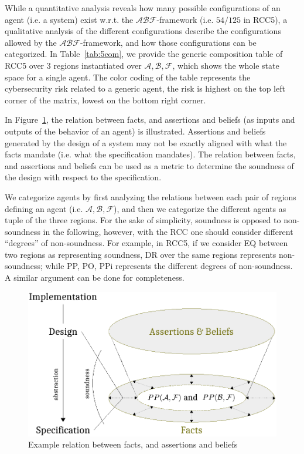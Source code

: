 \documentclass[conference]{IEEEtran}
\newcommand{\assertionRegion}{\mathcal{A}}
\newcommand{\beliefRegion}{\mathcal{B}}
\newcommand{\factRegion}{\mathcal{F}}
\newcommand{\abf}{\assertionRegion,\beliefRegion,\factRegion}
\newcommand{\abftheory}{\assertionRegion\beliefRegion\factRegion}
\begin{document}
While a quantitative analysis reveals how many possible configurations of an
agent (i.e. a system) exist w.r.t. the $\abftheory$-framework (i.e. $54/125$ in RCC5), a
qualitative analysis of the different configurations describe the
configurations allowed by the $\abftheory$-framework, and how those configurations can
be categorized.  In Table~\ref{tab:5com}, we provide the generic composition
table of RCC5 over 3 regions instantiated over $\abf$, which shows the whole
state space for a single agent. The color coding of the table represents the
cybersecurity risk related to a generic agent, the risk is highest on the top left
corner of the matrix, lowest on the bottom right corner. 

In Figure~\ref{fig:soundness}, the relation between facts, and assertions and
beliefs (as inputs and outputs of the behavior of an agent) is illustrated.
Assertions and beliefs generated by the design of a system may not be exactly
aligned with what the facts mandate (i.e. what the specification mandates).
The relation between facts, and assertions and beliefs can be used as a metric
to determine the soundness of the design with respect to the specification.

We categorize agents by first analyzing the relations between each pair of
regions defining an agent (i.e.  $\abf$), and then we categorize the different
agents as tuple of the three regions.  For the sake of simplicity, soundness is
opposed to non-soundness in the following, however, with the RCC one should
consider different ``degrees'' of non-soundness.  For example, in RCC5, if we
consider EQ between two regions as representing soundness, DR over the same
regions represents non-soundness; while PP, PO, PPi represents the different
degrees of non-soundness.  A similar argument can be done for completeness.  
\begin{figure}[t]
	\centering
	\includegraphics[width=.9\columnwidth]{soundness.pdf}
	\caption{Example relation between facts, and assertions and beliefs}
	\label{fig:soundness}
\end{figure}
\end{document}
